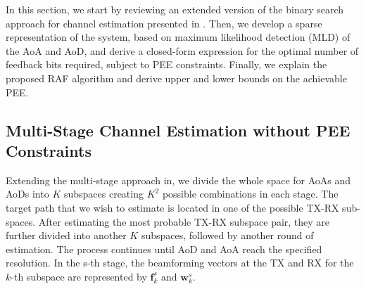 \documentclass{ieeeaccess}
\begin{document}
In this section, we start by reviewing an extended version of the binary search approach for channel estimation presented in \cite{RH}. Then, we develop a sparse representation of the system, based on maximum likelihood detection (MLD) of the AoA and AoD, and derive a closed-form expression for the optimal number of feedback bits required, subject to PEE constraints. Finally, we explain the proposed RAF algorithm and derive upper and lower bounds on the achievable PEE.



\subsection{Multi-Stage Channel Estimation without PEE Constraints}
Extending the multi-stage approach in\cite{RH}, we divide the whole space for AoAs and AoDs into $K$ subspaces creating $K^2$ possible combinations in each stage. The target path that we wish to estimate is located in one of the possible TX-RX sub-spaces. After estimating the most probable TX-RX subspace pair, they are further divided into another $K$ subspaces, followed by another round of estimation. The process continues until AoD and AoA reach the specified resolution. In the s-th stage, the beamforming vectors at the TX and RX for the $k$-th subspace are represented by $\boldsymbol{f}^s_k$ and $\boldsymbol{w}^s_k$.
\end{document}
